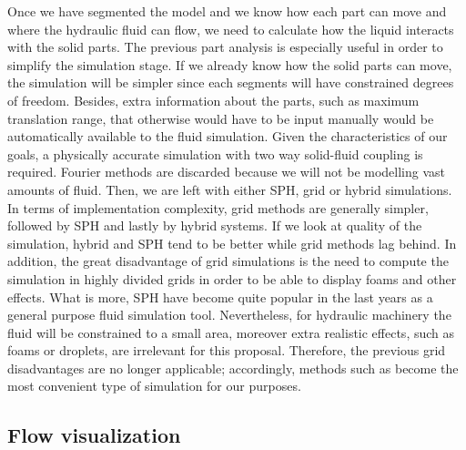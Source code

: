 Once we have segmented the model and we know how each part can move and where the hydraulic fluid can flow, we need to calculate how the liquid interacts with the solid parts.
The previous part analysis is especially useful in order to simplify the simulation stage.
If we already know how the solid parts can move, the simulation will be simpler since each segments will have constrained degrees of freedom.
Besides, extra information about the parts, such as maximum translation range, that otherwise would have to be input manually would be automatically available to the fluid simulation.
Given the characteristics of our goals, a physically accurate simulation with two way solid-fluid coupling is required.
Fourier methods are discarded because we will not be modelling vast amounts of fluid.
Then, we are left with either SPH, grid or hybrid simulations.
In terms of implementation complexity, grid methods are generally simpler, followed by SPH and lastly by hybrid systems.
If we look at quality of the simulation, hybrid and SPH tend to be better while grid methods lag behind.
In addition, the great disadvantage of grid simulations is the need to compute the simulation in highly divided grids in order to be able to display foams and other effects.
What is more, SPH have become quite popular in the last years as a general purpose fluid simulation tool.
Nevertheless, for hydraulic machinery the fluid will be constrained to a small area, moreover extra realistic effects, such as foams or droplets, are irrelevant for this proposal.
Therefore, the previous grid disadvantages are no longer applicable; accordingly, methods such as \cite{Carlson2004} become the most convenient type of simulation for our purposes.


\subsection{Flow visualization}

